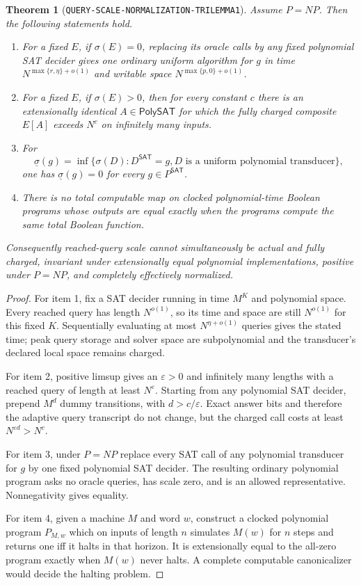 \documentclass[11pt]{article}
\newtheorem{theorem}{Theorem}
\newcommand{\SAT}{\mathsf{SAT}}
\begin{document}
\begin{theorem}[\texttt{QUERY-SCALE-NORMALIZATION-TRILEMMA1}]
Assume $P=NP$.  Then the following statements hold.
\begin{enumerate}[leftmargin=1.5em]
\item For a fixed $E$, if $\sigma(E)=0$, replacing its oracle calls by any
fixed polynomial SAT decider gives one ordinary uniform algorithm for $g$ in
time $N^{\max\{r,\eta\}+o(1)}$ and writable space
$N^{\max\{p,0\}+o(1)}$.
\item For a fixed $E$, if $\sigma(E)>0$, then for every constant $c$ there is
an extensionally identical $A\in\mathsf{PolySAT}$ for which the fully charged
composite $E[A]$ exceeds $N^c$ on infinitely many inputs.
\item For
\[
 \underline\sigma(g)=\inf\{\sigma(D):D^{\SAT}=g,
 D\text{ is a uniform polynomial transducer}\},
\]
one has $\underline\sigma(g)=0$ for every $g\in P^{\SAT}$.
\item There is no total computable map on clocked polynomial-time Boolean
programs whose outputs are equal exactly when the programs compute the same
total Boolean function.
\end{enumerate}
Consequently reached-query scale cannot simultaneously be actual and fully
charged, invariant under extensionally equal polynomial implementations,
positive under $P=NP$, and completely effectively normalized.
\end{theorem}

\begin{proof}
For item 1, fix a SAT decider running in time $M^K$ and polynomial space.
Every reached query has length $N^{o(1)}$, so its time and space are still
$N^{o(1)}$ for this fixed $K$.  Sequentially evaluating at most
$N^{\eta+o(1)}$ queries gives the stated time; peak query storage and solver
space are subpolynomial and the transducer's declared local space remains
charged.

For item 2, positive limsup gives an $\varepsilon>0$ and infinitely many
lengths with a reached query of length at least $N^\varepsilon$.  Starting
from any polynomial SAT decider, prepend $M^d$ dummy transitions, with
$d>c/\varepsilon$.  Exact answer bits and therefore the adaptive query
transcript do not change, but the charged call costs at least
$N^{\varepsilon d}>N^c$.

For item 3, under $P=NP$ replace every SAT call of any polynomial transducer
for $g$ by one fixed polynomial SAT decider.  The resulting ordinary
polynomial program asks no oracle queries, has scale zero, and is an allowed
representative.  Nonnegativity gives equality.

For item 4, given a machine $M$ and word $w$, construct a clocked polynomial
program $P_{M,w}$ which on inputs of length $n$ simulates $M(w)$ for $n$
steps and returns one iff it halts in that horizon.  It is extensionally
equal to the all-zero program exactly when $M(w)$ never halts.  A complete
computable canonicalizer would decide the halting problem.
\end{proof}
\end{document}
